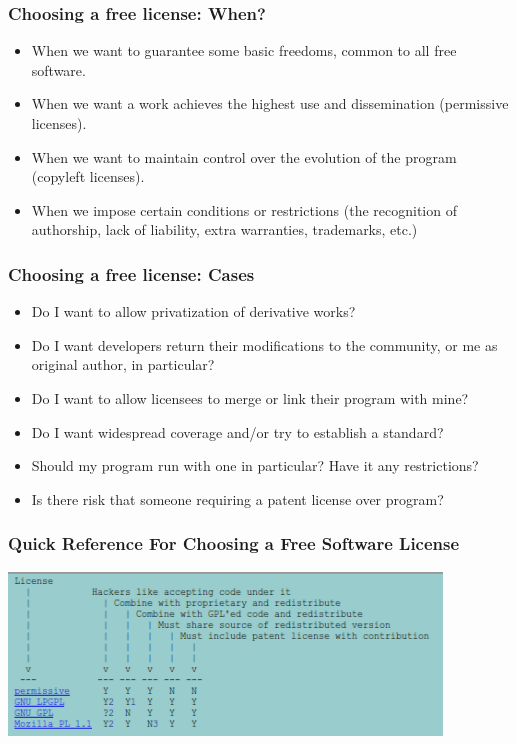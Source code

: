 
\begin{frame}
\frametitle{Choosing a free license: When?}

\begin{itemize}
\item When we want to guarantee some basic freedoms, common to all free software.
\item When we want a work achieves the highest use and dissemination (permissive licenses).
\item When we want to maintain control over the evolution of the program (copyleft licenses).
\item When we impose certain conditions or restrictions (the recognition of authorship, lack of liability, extra warranties, trademarks, etc.)
\end{itemize}

\end{frame}



\begin{frame}
\frametitle{Choosing a free license: Cases}

\begin{itemize}
\item Do I want to allow privatization of derivative works?
\pause
\item Do I want developers return their modifications to the community, or me as original author, in particular?
\pause
\item Do I want to allow licensees to merge or link their program with mine?
\pause
\item Do I want widespread coverage and/or try to establish a standard?
\pause
\item Should my program run with one in particular? Have it any restrictions?
\pause
\item Is there risk that someone requiring a patent license over program?
\end{itemize}


\end{frame}


\begin{frame}
\frametitle{Quick Reference For Choosing a Free Software License}

\begin{center}
\includegraphics[width=11.5cm]{figs/licenses_quick_reference.png}
\end{center}

\end{frame}

